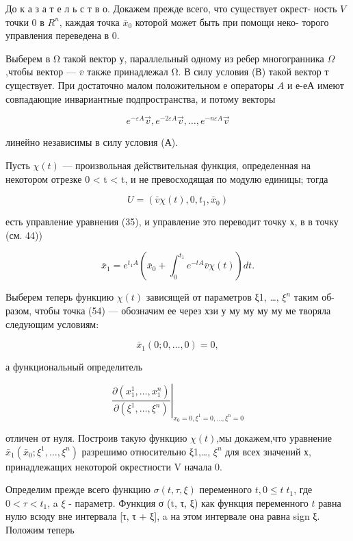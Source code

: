 \documentclass[10pt]{article}
\begin{document}
До к а з а т е л ь с т в о. Докажем прежде всего, что существует окрест- ность \(V\) точки 0 в \({R}^{n}\), каждая точка \({\bar{x}}_{0}\) которой может быть при помощи неко- торого управления переведена в 0.

Выберем в Ω такой вектор у, параллельный одному из ребер многогранника \(\Omega\),чтобы вектор — \(\bar{v}\) также принадлежал Ω. В силу условия (В) такой вектор т существует. При достаточно малом положительном е операторы \(A\) и е-еА имеют совпадающие инвариантные подпространства, и потому векторы

\[
{e}^{-{\varepsilon A}}\overrightarrow{v},{e}^{-{2\varepsilon A}}\overrightarrow{v},\ldots,{e}^{-{n\varepsilon A}}\overrightarrow{v}
\]

линейно независимы в силу условия (А).

Пусть \(\chi \left( t\right)\) — произвольная действительная функция, определенная на некотором отрезке 0 < t < t, и не превосходящая по модулю единицы; тогда

\[
U = \left( {\bar{v}\chi \left( t\right),0,{t}_{1},{\bar{x}}_{0}}\right)
\]

есть управление уравнения (35), и управление это переводит точку х, в в точку (см. 44))

\[
{\bar{x}}_{1} = {e}^{{t}_{1}A}\left( {{\bar{x}}_{0} + {\int }_{0}^{{t}_{1}}{e}^{-{tA}}\bar{v}\chi \left( t\right) }\right) {dt}. \tag{54}
\]

Выберем теперь функцию \(\chi \left( t\right)\) зависящей от параметров ξ1, …, \({\xi }^{n}\) таким об- разом, чтобы точка (54) — обозначим ее через хзи у му му му му ме творяла следующим условиям:

\[
{\bar{x}}_{1}\left( {0;0,\ldots,0}\right)  = 0,
\]

а функциональный определитель

\[
{\left. \frac{\partial \left( {{x}_{1}^{1},\ldots,{x}_{1}^{n}}\right) }{\partial \left( {{\xi }^{1},\ldots,{\xi }^{n}}\right) }\right| }_{{x}_{0} = 0,{\xi }^{1} = 0,\ldots,{\xi }^{n} = 0}
\]

отличен от нуля. Построив такую функцию \(\chi \left( t\right)\),мы докажем,что уравнение \({\bar{x}}_{1}\left( {{\bar{x}}_{0};{\xi }^{1},\ldots,{\xi }^{n}}\right)\) разрешимо относительно ξ1,…, \({\xi }^{n}\) для всех значений х, принадлежащих некоторой окрестности V начала 0.

Определим прежде всего функцию \(\sigma \left( {t,\tau,\xi }\right)\) переменного \(t,0 \leq  t\;{t}_{1}\), где \(0 < \tau  < {t}_{1}\), a \(\xi\) - параметр. Функция σ (t, τ, ξ) как функция переменного \(t\) равна нулю всюду вне интервала [τ, τ + ξ], a на этом интервале она равна sign ξ. Положим теперь
\end{document}
